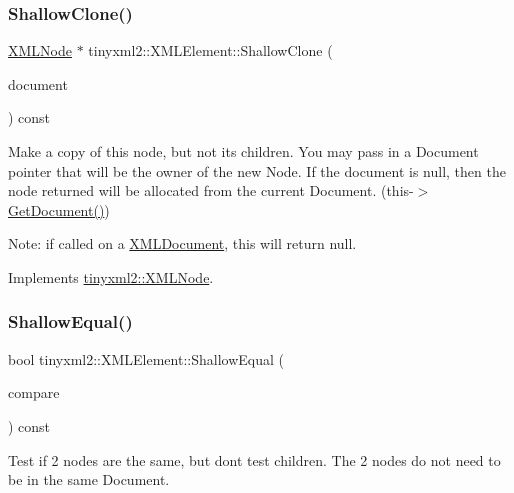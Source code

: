 \subsubsection{\texorpdfstring{Shallow\+Clone()}{ShallowClone()}}
{\footnotesize\ttfamily \hyperlink{classtinyxml2_1_1_x_m_l_node}{X\+M\+L\+Node} $\ast$ tinyxml2\+::\+X\+M\+L\+Element\+::\+Shallow\+Clone (\begin{DoxyParamCaption}\item[{\hyperlink{classtinyxml2_1_1_x_m_l_document}{X\+M\+L\+Document} $\ast$}]{document }\end{DoxyParamCaption}) const\hspace{0.3cm}{\ttfamily [virtual]}}

Make a copy of this node, but not its children. You may pass in a Document pointer that will be the owner of the new Node. If the \textquotesingle{}document\textquotesingle{} is null, then the node returned will be allocated from the current Document. (this-\/$>$\hyperlink{classtinyxml2_1_1_x_m_l_node_af343d1ef0b45c0020e62d784d7e67a68}{Get\+Document()})

Note\+: if called on a \hyperlink{classtinyxml2_1_1_x_m_l_document}{X\+M\+L\+Document}, this will return null. 

Implements \hyperlink{classtinyxml2_1_1_x_m_l_node_a8402cbd3129d20e9e6024bbcc0531283}{tinyxml2\+::\+X\+M\+L\+Node}.

\mbox{\label{classtinyxml2_1_1_x_m_l_element_a61ffd7bf918a9db4aa6203d855ac5ec2}} 
\subsubsection{\texorpdfstring{Shallow\+Equal()}{ShallowEqual()}}
{\footnotesize\ttfamily bool tinyxml2\+::\+X\+M\+L\+Element\+::\+Shallow\+Equal (\begin{DoxyParamCaption}\item[{const \hyperlink{classtinyxml2_1_1_x_m_l_node}{X\+M\+L\+Node} $\ast$}]{compare }\end{DoxyParamCaption}) const\hspace{0.3cm}{\ttfamily [virtual]}}

Test if 2 nodes are the same, but don\textquotesingle{}t test children. The 2 nodes do not need to be in the same Document.

